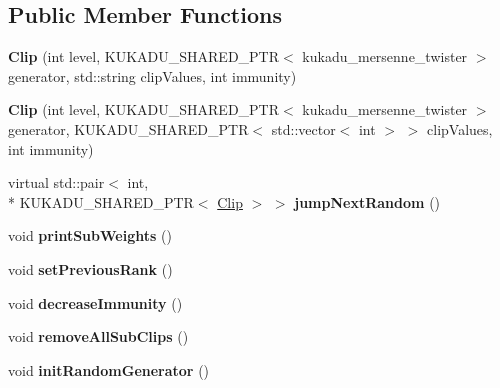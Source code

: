 \subsection*{Public Member Functions}
\begin{DoxyCompactItemize}
\item 
\hypertarget{classkukadu_1_1Clip_a83a5e4e39bce4974e6b18cee366a67ef}{{\bfseries Clip} (int level, K\-U\-K\-A\-D\-U\-\_\-\-S\-H\-A\-R\-E\-D\-\_\-\-P\-T\-R$<$ kukadu\-\_\-mersenne\-\_\-twister $>$ generator, std\-::string clip\-Values, int immunity)}\label{classkukadu_1_1Clip_a83a5e4e39bce4974e6b18cee366a67ef}

\item 
\hypertarget{classkukadu_1_1Clip_a4ac76920acd4a62b5e5a2ab72dc2c83a}{{\bfseries Clip} (int level, K\-U\-K\-A\-D\-U\-\_\-\-S\-H\-A\-R\-E\-D\-\_\-\-P\-T\-R$<$ kukadu\-\_\-mersenne\-\_\-twister $>$ generator, K\-U\-K\-A\-D\-U\-\_\-\-S\-H\-A\-R\-E\-D\-\_\-\-P\-T\-R$<$ std\-::vector$<$ int $>$ $>$ clip\-Values, int immunity)}\label{classkukadu_1_1Clip_a4ac76920acd4a62b5e5a2ab72dc2c83a}

\item 
\hypertarget{classkukadu_1_1Clip_a6591c7a207c086426e11027419d4f895}{virtual std\-::pair$<$ int, \\*
K\-U\-K\-A\-D\-U\-\_\-\-S\-H\-A\-R\-E\-D\-\_\-\-P\-T\-R$<$ \hyperlink{classkukadu_1_1Clip}{Clip} $>$ $>$ {\bfseries jump\-Next\-Random} ()}\label{classkukadu_1_1Clip_a6591c7a207c086426e11027419d4f895}

\item 
\hypertarget{classkukadu_1_1Clip_a4c58b4758a6b673bd26ce3afbeb1f259}{void {\bfseries print\-Sub\-Weights} ()}\label{classkukadu_1_1Clip_a4c58b4758a6b673bd26ce3afbeb1f259}

\item 
\hypertarget{classkukadu_1_1Clip_ab63c6f4922b2e61d5caedae2ab4e9566}{void {\bfseries set\-Previous\-Rank} ()}\label{classkukadu_1_1Clip_ab63c6f4922b2e61d5caedae2ab4e9566}

\item 
\hypertarget{classkukadu_1_1Clip_a3d532729bf05cebcfcf049be5c15383b}{void {\bfseries decrease\-Immunity} ()}\label{classkukadu_1_1Clip_a3d532729bf05cebcfcf049be5c15383b}

\item 
\hypertarget{classkukadu_1_1Clip_a72e5e78f3bdc0f80c32e4775e37d4b04}{void {\bfseries remove\-All\-Sub\-Clips} ()}\label{classkukadu_1_1Clip_a72e5e78f3bdc0f80c32e4775e37d4b04}

\item 
\hypertarget{classkukadu_1_1Clip_a5cfdcf67876c3856b65f6bceb07a0cfd}{void {\bfseries init\-Random\-Generator} ()}\label{classkukadu_1_1Clip_a5cfdcf67876c3856b65f6bceb07a0cfd}


\end{DoxyCompactItemize}
